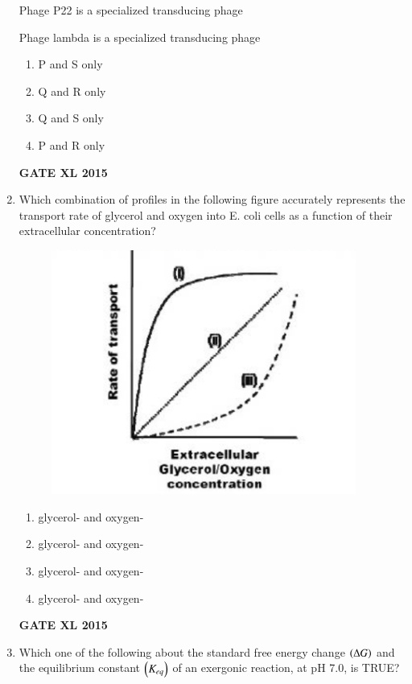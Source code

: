 \documentclass[journal,12pt,onecolumn]{IEEEtran}
\begin{document}
\begin{enumerate}
 Phage P22 is a specialized transducing phage

 Phage lambda  is a specialized transducing phage
    \begin{enumerate}
            \item P and S only
	    \item Q and R only
	    \item Q and S only
            \item P and R only
    \end{enumerate}
\hfill{\textbf{GATE XL 2015}}
\item Which combination of profiles in the following figure accurately represents the transport rate of glycerol and oxygen into E. coli cells as a function of their extracellular concentration?


	\begin{figure}[h!]
		\centering
	\includegraphics[width=10cm]{77}
		    \caption*{}
		\label{fig:Q77}
	\end{figure}
    \begin{enumerate}
	    \item glycerol- and oxygen-
	    \item glycerol- and oxygen-
	    \item glycerol- and oxygen-
	    \item glycerol- and oxygen-
    \end{enumerate}
\hfill{\textbf{GATE XL 2015}}
\item Which one of the following about the standard free energy change $\left(\Delta G\right)$ and the equilibrium constant $\left(K_{eq}\right)$ of an exergonic reaction, at pH 7.0, is TRUE?
    \begin{enumerate}

\end{enumerate}
\end{enumerate}
\end{document}
